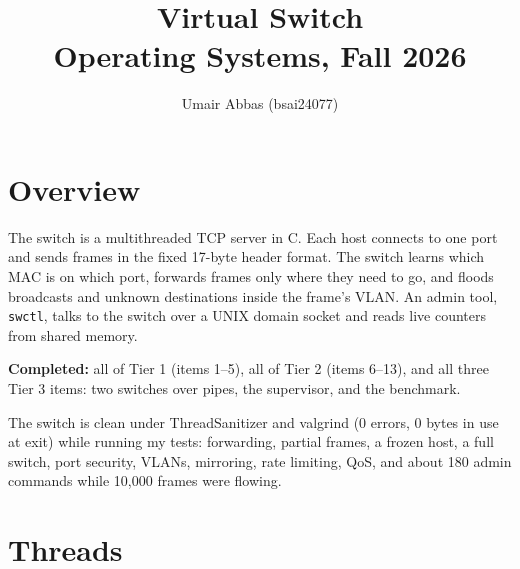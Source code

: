 \documentclass[11pt,a4paper]{article}
\title{Virtual Switch\\[2pt]\large Operating Systems, Fall 2026}
\author{Umair Abbas \quad (bsai24077)}
\date{}
\begin{document}
\maketitle
\vspace{-1.5em}

\section{Overview}

The switch is a multithreaded TCP server in C. Each host connects to one
port and sends frames in the fixed 17-byte header format. The switch learns
which MAC is on which port, forwards frames only where they need to go, and
floods broadcasts and unknown destinations inside the frame's VLAN.
An admin tool, \texttt{swctl}, talks to the switch over a UNIX domain socket
and reads live counters from shared memory.

\textbf{Completed:} all of Tier 1 (items 1--5), all of Tier 2 (items 6--13), and all
three Tier 3 items: two switches over pipes, the supervisor, and the benchmark.

The switch is clean under ThreadSanitizer and valgrind (0 errors, 0 bytes in
use at exit) while running my tests: forwarding, partial frames, a frozen
host, a full switch, port security, VLANs, mirroring, rate limiting, QoS, and
about 180 admin commands while 10,000 frames were flowing.

\section{Threads}

\begin{center}
\end{center}
\end{document}
